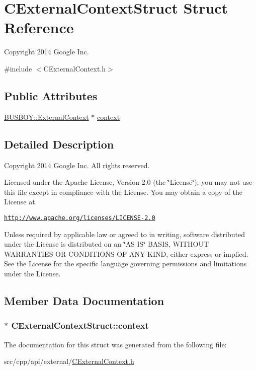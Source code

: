 \hypertarget{structCExternalContextStruct}{
\section{CExternalContextStruct Struct Reference}
\label{structCExternalContextStruct}
}


Copyright 2014 Google Inc.  


{\ttfamily \#include $<$CExternalContext.h$>$}\subsection*{Public Attributes}
\begin{DoxyCompactItemize}
\item 
\hyperlink{classBUSBOY_1_1ExternalContext}{BUSBOY::ExternalContext} $\ast$ \hyperlink{structCExternalContextStruct_a45ebd2b02d81e80fadae8c298709c688}{context}
\end{DoxyCompactItemize}


\subsection{Detailed Description}
Copyright 2014 Google Inc. All rights reserved.

Licensed under the Apache License, Version 2.0 (the \char`\"{}License\char`\"{}); you may not use this file except in compliance with the License. You may obtain a copy of the License at

\href{http://www.apache.org/licenses/LICENSE-2.0}{\tt http://www.apache.org/licenses/LICENSE-\/2.0}

Unless required by applicable law or agreed to in writing, software distributed under the License is distributed on an \char`\"{}AS IS\char`\"{} BASIS, WITHOUT WARRANTIES OR CONDITIONS OF ANY KIND, either express or implied. See the License for the specific language governing permissions and limitations under the License. 

\subsection{Member Data Documentation}
\hypertarget{structCExternalContextStruct_a45ebd2b02d81e80fadae8c298709c688}{
\subsubsection[{context}]{$\ast$ {\bf CExternalContextStruct::context}}}
\label{structCExternalContextStruct_a45ebd2b02d81e80fadae8c298709c688}


The documentation for this struct was generated from the following file:\begin{DoxyCompactItemize}
\item 
src/cpp/api/external/\hyperlink{CExternalContext_8h}{CExternalContext.h}\end{DoxyCompactItemize}

